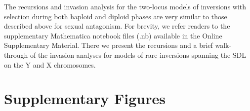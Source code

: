 \documentclass{article}
\begin{document}
The recursions and invasion analysis for the two-locus models of inversions with selection during both haploid and diploid phases are very similar to those described above for sexual antagonism. For brevity, we refer readers to the supplementary Mathematica notebook files (.nb) available in the Online Supplementary Material. There we present the recursions and a brief walk-through of the invasion analyses for models of rare inversions spanning the SDL on the Y and X chromosomes.






 \section{Supplementary Figures} \label{AppD}
 \renewcommand{\theequation}{D\arabic{equation}}
 \setcounter{equation}{0}
 \renewcommand{\thefigure}{S\arabic{figure}}
 \setcounter{figure}{0}
\end{document}
